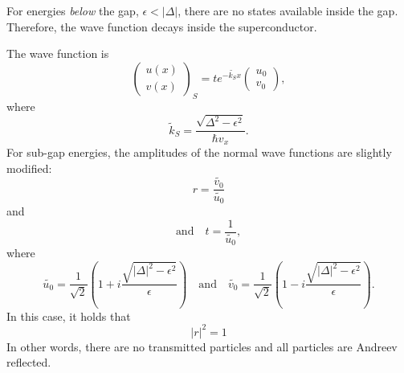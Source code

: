For energies \emph{below} the gap, $\epsilon < |\Delta |$, there are no states available inside the gap. Therefore, the wave function decays inside the superconductor. 

The wave function is
\begin{equation}
\begin{pmatrix} u\left(x\right) \\ v\left(x\right) \end{pmatrix}_S = t e^{- \tilde{k_S} x } \begin{pmatrix} u_0 \\ v_0 \end{pmatrix},
\end{equation}
where
\begin{equation}
\tilde{k}_S= \frac{\sqrt{\Delta^2 - \epsilon^2 }}{\hbar v_x}.
\end{equation}
For sub-gap energies, the amplitudes of the normal wave functions are slightly modified:
\begin{equation}
r = \frac{\tilde{v_0}}{\tilde{u_0}} 
\end{equation}
and
\begin{equation}
\text{and} \quad t = \frac{1}{\tilde{u_0}}, 
\end{equation}
where
\begin{equation}
\tilde{u_0} = \frac{1}{\sqrt{2}} \left( 1 + i \frac{\sqrt{|\Delta|^2 - \epsilon^2}}{\epsilon} \right) \quad \text{and} \quad \tilde{v_0} = \frac{1}{\sqrt{2}} \left( 1 - i \frac{\sqrt{|\Delta|^2 - \epsilon^2}}{\epsilon} \right).
\end{equation}
In this case, it holds that
\begin{equation}
|r|^2 = 1
\end{equation}
In other words, there are no transmitted particles and all particles are Andreev reflected.

